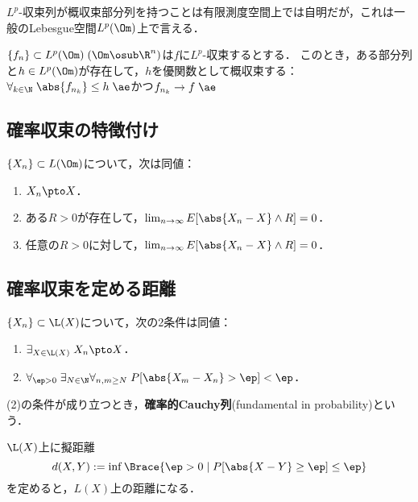 \documentclass[uplatex,dvipdfmx]{jsreport}
\begin{document}
\begin{remarks}
    $L^p$-収束列が概収束部分列を持つことは有限測度空間上では自明だが，これは一般のLebesgue空間$L^p(\Om)$上で言える．
\end{remarks}
\begin{theorem}[概収束部分列の存在]
    $\{f_n\}\subset L^p(\Om)\;(\Om\osub\R^n)$は$f$に$L^p$-収束するとする．
    このとき，ある部分列と$h\in L^p(\Om)$が存在して，$h$を優関数として概収束する：$\forall_{k\in\N}\;\abs{f_{n_k}}\le h\;\ae$かつ$f_{n_k}\to f\;\ae$
\end{theorem}

\subsection{確率収束の特徴付け}

\begin{proposition}
    $\{X_n\}\subset L(\Om)$について，次は同値：
    \begin{enumerate}
        \item $X_n\pto X$．
        \item ある$R>0$が存在して，$\lim_{n\to\infty}E[\abs{X_n-X}\land R]=0$．
        \item 任意の$R>0$に対して，$\lim_{n\to\infty}E[\abs{X_n-X}\land R]=0$．
    \end{enumerate}
\end{proposition}

\subsection{確率収束を定める距離}

\begin{proposition}[確率収束の特徴付け]
    $\{X_n\}\subset\L(X)$について，次の2条件は同値：
    \begin{enumerate}
        \item $\exists_{X\in\L(X)}\;X_n\pto X$．
        \item $\forall_{\ep>0}\;\exists_{N\in\N}\forall_{n,m\ge N}\;P[\abs{X_m-X_n}>\ep]<\ep$．
    \end{enumerate}
    (2)の条件が成り立つとき，\textbf{確率的Cauchy列}(fundamental in probability)という．
\end{proposition}

\begin{definition}
    $\L(X)$上に擬距離
    \[d(X,Y):=\inf\Brace{\ep>0\mid P[\abs{X-Y}\ge\ep]\le\ep}\]
    を定めると，$L(X)$上の距離になる．
\end{definition}
\end{document}
